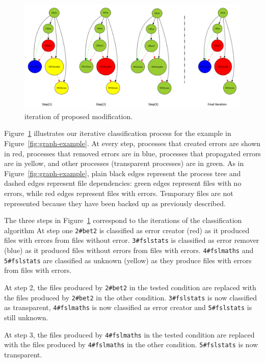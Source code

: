 \documentclass{article}
\begin{document}
{\begin{figure}[H]
\centering
  \includegraphics[scale=0.5]{images/iterative_modif}
  \caption{iteration of proposed modification.}
  \label{fig:iterations}
\end{figure}

Figure~\ref{fig:iterations} illustrates our iterative classification 
process for the example in Figure~\ref{fig:graph-example}. At every 
step, processes that created errors are shown in red, processes that 
removed errors are in blue, processes that propagated errors are in 
yellow, and other processes (transparent processes) are in green. As in 
Figure~\ref{fig:graph-example}, plain black edges represent the process 
tree and dashed edges represent file dependencies: green edges 
represent files with no errors, while red edges represent files with 
errors. Temporary files are not represented because they have been 
backed up as previously described.

The three steps in Figure~\ref{fig:iterations} correspond to the 
iterations of the classification algorithm At step one \texttt{2\#bet2} 
is classified as error creator (red) as it produced files with errors 
from files without error. \texttt{3\#fslstats} is classified as error 
remover (blue) as it produced files without errors from files with 
errors. \texttt{4\#fslmaths} and \texttt{5\#fslstats} are classified as 
unknown (yellow) as they produce files with errors from files with 
errors.

At step 2, the files produced by \texttt{2\#bet2} in the tested 
condition are replaced with the files produced by \texttt{2\#bet2} in 
the other condition. \texttt{3\#fslstats} is now classified as 
transparent, \texttt{4\#fslmaths} is now classified as error creator 
and \texttt{5\#fslstats} is still unknown.

 At step 3, the files produced by \texttt{4\#fslmaths} in the tested 
 condition are replaced with the files produced by \texttt{4\#fslmaths} 
 in the other condition. \texttt{5\#fslstats} is now transparent.
 
}
\end{document}

